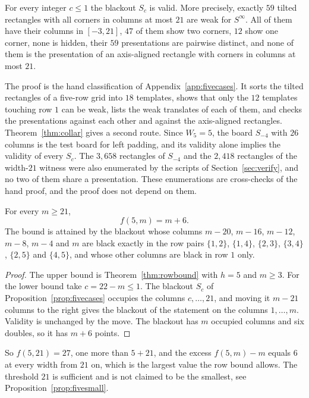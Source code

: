 \begin{proposition}\label{prop:fivecases}
For every integer $c\le1$ the blackout $S_c$ is valid. More precisely, exactly $59$ tilted
rectangles with all corners in columns at most $21$ are weak for $S^{\infty}$. All of them
have their columns in $[-3,21]$, $47$ of them show two corners, $12$ show one corner, none is
hidden, their $59$ presentations are pairwise distinct, and none of them is the presentation
of an axis-aligned rectangle with corners in columns at most $21$.
\end{proposition}

The proof is the hand classification of Appendix~\ref{app:fivecases}. It sorts the tilted
rectangles of a five-row grid into $18$ templates, shows that only the $12$ templates touching
row $1$ can be weak, lists the weak translates of each of them, and checks the presentations
against each other and against the axis-aligned rectangles. Theorem~\ref{thm:collar} gives a
second route. Since $W_5=5$, the board $S_{-4}$ with $26$ columns is the test board for left
padding, and its validity alone implies the validity of every $S_c$. The $3{,}658$ rectangles
of $S_{-4}$ and the $2{,}418$ rectangles of the width-$21$ witness were also enumerated by the
scripts of Section~\ref{sec:verify}, and no two of them share a presentation. These
enumerations are cross-checks of the hand proof, and the proof does not depend on them.

\begin{theorem}\label{thm:fiverow}
For every $m\ge21$,
\[
f(5,m)=m+6.
\]
The bound is attained by the blackout whose columns $m-20$, $m-16$, $m-12$, $m-8$, $m-4$ and
$m$ are black exactly in the row pairs $\{1,2\}$, $\{1,4\}$, $\{2,3\}$, $\{3,4\}$, $\{2,5\}$
and $\{4,5\}$, and whose other columns are black in row $1$ only.
\end{theorem}

\begin{proof}
The upper bound is Theorem~\ref{thm:rowbound} with $h=5$ and $m\ge3$. For the lower bound take
$c=22-m\le1$. The blackout $S_c$ of Proposition~\ref{prop:fivecases} occupies the columns
$c,\dots,21$, and moving it $m-21$ columns to the right gives the blackout of the statement
on the columns $1,\dots,m$. Validity is unchanged by the move. The blackout has $m$ occupied
columns and six doubles, so it has $m+6$ points.
\end{proof}

So $f(5,21)=27$, one more than $5+21$, and the excess $f(5,m)-m$ equals $6$ at every width from
$21$ on, which is the largest value the row bound allows. The threshold $21$ is sufficient
and is not claimed to be the smallest, see Proposition~\ref{prop:fivesmall}.

